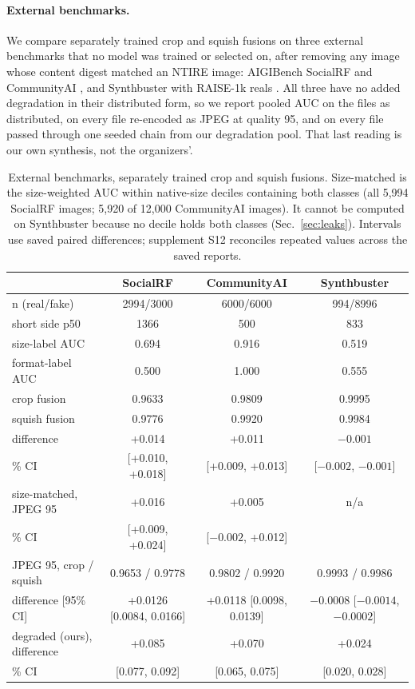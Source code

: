 \documentclass[letterpaper]{article} %
\begin{document}
\paragraph{External benchmarks.} We compare separately trained crop and
squish fusions on three external benchmarks that no model was trained or selected on, after removing any image whose content
digest matched an NTIRE image: AIGIBench SocialRF and CommunityAI
\cite{li2025aigibench}, and Synthbuster with RAISE-1k reals
\cite{bammey2024synthbuster,dangnguyen2015raise}. All three have no added degradation in their distributed form, so we
report pooled AUC on the files as distributed, on every file re-encoded as
JPEG at quality 95, and on every file passed through one seeded chain from
our degradation pool. That last reading is our own synthesis, not the
organizers'.

\begin{table}[t]
\centering
\small
\begin{tabular}{lccc}
\toprule
 & SocialRF & CommunityAI & Synthbuster \\
\midrule
n (real/fake) & 2994/3000 & 6000/6000 & 994/8996 \\
short side p50 & 1366 & 500 & 833 \\
size-label AUC & 0.694 & 0.916 & 0.519 \\
format-label AUC & 0.500 & 1.000 & 0.555 \\
\midrule
crop fusion & 0.9633 & 0.9809 & 0.9995 \\
squish fusion & 0.9776 & 0.9920 & 0.9984 \\
difference & +0.014 & +0.011 & $-0.001$ \\
\quad 95\% CI & [+0.010, +0.018] & [+0.009, +0.013] & [$-0.002$, $-0.001$] \\
\midrule
size-matched, JPEG 95 & +0.016 & +0.005 & n/a \\
\quad 95\% CI & [+0.009, +0.024] & [$-0.002$, +0.012] & \\
JPEG 95, crop / squish & 0.9653 / 0.9778 & 0.9802 / 0.9920 & 0.9993 / 0.9986 \\
\quad difference [95\% CI] & +0.0126 [0.0084, 0.0166] & +0.0118 [0.0098, 0.0139] & $-0.0008$ [$-0.0014$, $-0.0002$] \\
degraded (ours), difference & +0.085 & +0.070 & +0.024 \\
\quad 95\% CI & [0.077, 0.092] & [0.065, 0.075] & [0.020, 0.028] \\
\bottomrule
\end{tabular}
\caption{External benchmarks, separately trained crop and squish fusions.
Size-matched is the size-weighted AUC within native-size deciles containing
both classes (all 5,994 SocialRF images; 5,920 of 12,000 CommunityAI images). It cannot be computed on Synthbuster
because no decile holds both classes (Sec.~\ref{sec:leaks}). Intervals use saved paired differences; supplement S12 reconciles repeated values across the saved reports.}
\label{tab:external}
\end{table}
\end{document}
